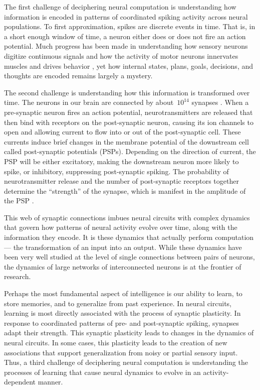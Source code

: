 The first challenge of deciphering neural computation is understanding
how information is encoded in patterns of coordinated spiking activity
across neural populations. To first approximation, spikes are
discrete events in time.  That is, in a short enough
window of time, a neuron either does or does not fire an action
potential.  Much progress has been made in understanding how sensory
neurons digitize continuous signals and how the activity of motor
neurons innervates muscles and drives behavior \citep{rieke1999spikes}, yet how internal
states, plans, goals, decisions, and thoughts are encoded remains
largely a mystery.


The second challenge is understanding how this information is
transformed over time. The neurons in our brain are connected by
about~$10^{14}$ synapses \citep{kandel2000principles}. When a
pre-synaptic neuron fires an action potential, neurotransmitters are
released that then bind with receptors on the post-synaptic neuron,
causing its ion channels to open and allowing current to flow into or
out of the post-synaptic cell. These currents induce brief changes in
the membrane potential of the downstream cell called post-synaptic
potentials (PSPs). Depending on the direction of current, the PSP will
be either excitatory, making the downstream neuron more likely to
spike, or inhibitory, suppressing post-synaptic spiking. The 
probability of neurotransmitter release and the number of post-synaptic 
receptors together determine the ``strength'' of the synapse, 
which is manifest in the amplitude of the PSP \citep{cowan2003synapses}. 


This web of synaptic connections imbues neural circuits with complex
dynamics that govern how patterns of neural activity evolve over time,
along with the information they encode. It is these dynamics that actually
perform computation --- the transformation of an input into an output.
While these dynamics have been very well studied at the level of
single connections between pairs of neurons, the dynamics of large
networks of interconnected neurons is at the frontier of research.

Perhaps the most fundamental aspect of intelligence is our ability to
learn, to store memories, and to generalize from past experience.  In
neural circuits, learning is most directly associated with the process
of synaptic plasticity. In response to coordinated patterns of pre-
and post-synaptic spiking, synapses adapt their strength. This synaptic
plasticity leads to changes in the dynamics of neural circuits.  In
some cases, this plasticity leads to the creation of new associations
that support generalization from noisy or partial sensory input.
Thus, a third challenge of deciphering neural computation is
understanding the processes of learning that cause neural dynamics to
evolve in an activity-dependent manner.

